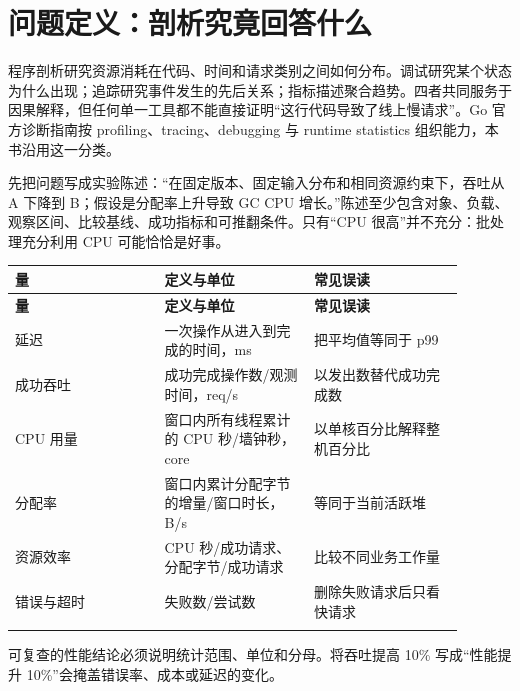 \documentclass[UTF8,fontset=fandol,openany,11pt]{ctexbook}
\begin{document}
\section{问题定义：剖析究竟回答什么}
程序剖析研究资源消耗在代码、时间和请求类别之间如何分布。调试研究某个状态为什么出现；追踪研究事件发生的先后关系；指标描述聚合趋势。四者共同服务于因果解释，但任何单一工具都不能直接证明“这行代码导致了线上慢请求”。Go 官方诊断指南按 profiling、tracing、debugging 与 runtime statistics 组织能力，本书沿用这一分类。\cite{go-diagnostics}

先把问题写成实验陈述：“在固定版本、固定输入分布和相同资源约束下，吞吐从 A 下降到 B；假设是分配率上升导致 GC CPU 增长。”陈述至少包含对象、负载、观察区间、比较基线、成功指标和可推翻条件。只有“CPU 很高”并不充分：批处理充分利用 CPU 可能恰恰是好事。

\begingroup\small\setlength{\tabcolsep}{4pt}
\begin{longtable}{>{\raggedright\arraybackslash}p{0.298\linewidth}>{\raggedright\arraybackslash}p{0.298\linewidth}>{\raggedright\arraybackslash}p{0.298\linewidth}}
\toprule
\textbf{量} & \textbf{定义与单位} & \textbf{常见误读} \\
\midrule
\endfirsthead
\toprule
\textbf{量} & \textbf{定义与单位} & \textbf{常见误读} \\
\midrule
\endhead
延迟 & 一次操作从进入到完成的时间，ms & 把平均值等同于 p99 \\
\addlinespace[3pt]
成功吞吐 & 成功完成操作数/观测时间，req/s & 以发出数替代成功完成数 \\
\addlinespace[3pt]
CPU 用量 & 窗口内所有线程累计的 CPU 秒/墙钟秒，core & 以单核百分比解释整机百分比 \\
\addlinespace[3pt]
分配率 & 窗口内累计分配字节的增量/窗口时长，B/s & 等同于当前活跃堆 \\
\addlinespace[3pt]
资源效率 & CPU 秒/成功请求、分配字节/成功请求 & 比较不同业务工作量 \\
\addlinespace[3pt]
错误与超时 & 失败数/尝试数 & 删除失败请求后只看快请求 \\
\addlinespace[3pt]
\bottomrule
\end{longtable}
\endgroup
可复查的性能结论必须说明统计范围、单位和分母。将吞吐提高 10\% 写成“性能提升 10\%”会掩盖错误率、成本或延迟的变化。
\end{document}
